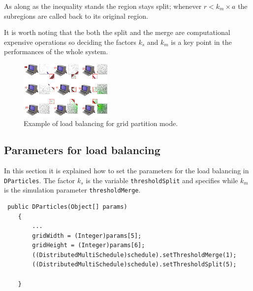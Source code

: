\documentclass{article}
\begin{document}
As along as the inequality stands the region stays split; whenever $r < k_m \times a$ the subregions are called back to its original region. 

It is worth noting that the both the split and the merge are computational expensive operations so deciding the factors $k_s$ and $k_m$ is a key point in the performances of the whole system.

\begin{figure}
\centering
\includegraphics[width=0.4\textwidth, bb=0 0 1302 827]{LoadBalancing.png}
\caption{Example of load balancing for grid partition mode. \label{fig:lb}}
\end{figure}

\subsection{Parameters for load balancing}
In this section it is explained how to set the parameters for the load balancing in \texttt{DParticles}. The factor $k_s$ is the variable \texttt{thresholdSplit} and specifies while $k_m$ is the simulation parameter \texttt{thresholdMerge}.

\begin{lstlisting}
 public DParticles(Object[] params)
    {    	
    	...
    	gridWidth = (Integer)params[5];
    	gridHeight = (Integer)params[6];
    	((DistributedMultiSchedule)schedule).setThresholdMerge(1);
        ((DistributedMultiSchedule)schedule).setThresholdSplit(5);

    }    
\end{lstlisting}
\end{document}
